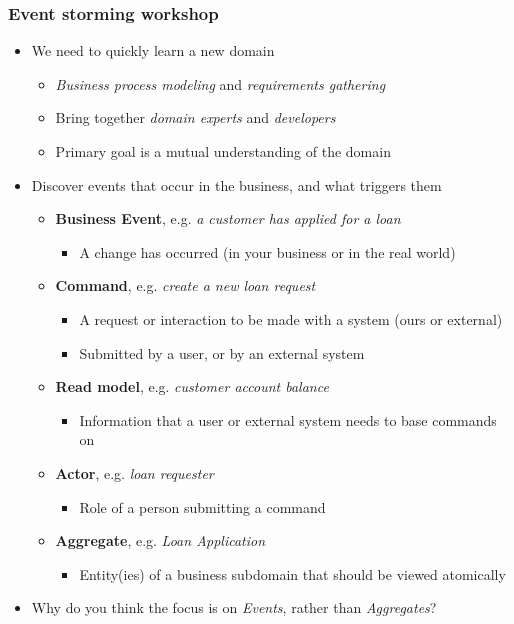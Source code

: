 \documentclass[8pt]{article}
\begin{document}
\subsubsection{Event storming workshop}
\label{sec:org978c53b}
\begin{itemize}
\item We need to quickly learn a new domain
\begin{itemize}
\item \emph{Business process modeling} and \emph{requirements gathering}
\item Bring together \emph{domain experts} and \emph{developers}
\item Primary goal is a mutual understanding of the domain
\end{itemize}

\item Discover events that occur in the business, and what triggers them
\begin{itemize}
\item \textbf{Business Event}, e.g. \emph{a customer has applied for a loan}
\begin{itemize}
\item A change has occurred (in your business or in the real world)
\end{itemize}
\item \textbf{Command}, e.g. \emph{create a new loan request}
\begin{itemize}
\item A request or interaction to be made with a system (ours or external)
\item Submitted by a user, or by an external system
\end{itemize}
\item \textbf{Read model}, e.g. \emph{customer account balance}
\begin{itemize}
\item Information that a user or external system needs to base commands on
\end{itemize}
\item \textbf{Actor}, e.g. \emph{loan requester}
\begin{itemize}
\item Role of a person submitting a command
\end{itemize}
\item \textbf{Aggregate}, e.g. \emph{Loan Application}
\begin{itemize}
\item Entity(ies) of a business subdomain that should be viewed atomically
\end{itemize}
\end{itemize}

\item Why do you think the focus is on \emph{Events}, rather than \emph{Aggregates}?
\end{itemize}
\end{document}
